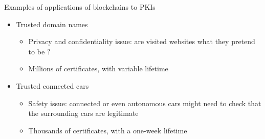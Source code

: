 %
%





\begin{frame}{Examples of applications of blockchains to PKIs}

\begin{itemize}
\item Trusted domain names
\begin{itemize}
\item Privacy and confidentiality issue: are visited websites what they pretend to be ?
\item Millions of certificates, with variable lifetime
\end{itemize}
\item Trusted connected cars
\begin{itemize}
\item Safety issue: connected or even autonomous cars might need to check that the surrounding cars are legitimate
\item Thousands of certificates, with a one-week lifetime
\end{itemize}
\end{itemize}


\end{frame}